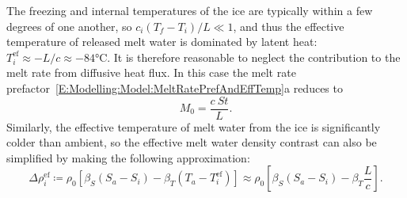\documentclass[openacc]{rsproca_new}%
\begin{document}
The freezing and internal temperatures of the ice are typically within a few degrees of one another, so $c_i(T_f - T_i)/ L \ll 1$, and thus the effective temperature of released melt water is dominated by latent heat: $T_i^{\text{ef}} \approx -L/c \approx -84\si{\celsius}$. It is therefore reasonable to neglect the contribution to the melt rate from diffusive heat flux. In this case the melt rate prefactor~\eqref{E:Modelling:Model:MeltRatePrefAndEffTemp}a reduces to
\begin{equation}\label{E:Modelling:Model:Closure:M0_simple}
 M_0 = \frac{c~\mathit{St}}{L}.
\end{equation}
Similarly, the effective temperature of melt water from the ice is significantly colder than ambient, so the effective melt water density contrast can also be simplified by making the following approximation:
\begin{equation}\label{E:Modelling:Model:EffectiveDensity}
\Delta \rho_i^{\text{ef}} \coloneqq \rho_0 \left[\beta_S\left(S_a - S_i\right) - \beta_T\left(T_a - T_i^{\text{ef}}\right)\right]  \approx \rho_0 \left[\beta_S\left(S_a - S_i\right) - \beta_T\frac{L}{c}\right].
\end{equation}
\end{document}

